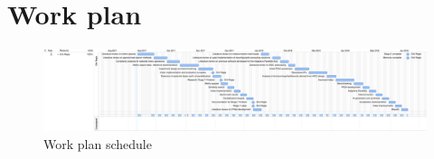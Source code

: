 \documentclass[11pt,letterpaper]{article}
\begin{document}
\section{Work plan}
\begin{figure}[!ht]
    \centering
  \includegraphics[scale=.15]{initial_planning_time_outline} 
    \caption{Work plan schedule}
    \label{FIGURE:WORKPLAN}
  \end{figure}



\end{document}
